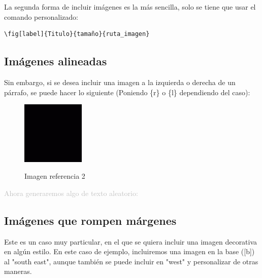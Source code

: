 La segunda forma de incluir imágenes es la más sencilla, solo se tiene que usar el comando personalizado:
\begin{verbatim} 
\fig[label]{Titulo}{tamaño}{ruta_imagen}
\end{verbatim}



\subsection{Imágenes alineadas}
Sin embargo, si se desea incluir una imagen a la izquierda o derecha de un párrafo, se puede hacer lo siguiente (Poniendo \{r\} o \{l\} dependiendo del caso):

\begin{figure} %
    \centering
    \begin{measuredfigure}
        \caption{Imagen referencia 2}
        \includegraphics[height=3cm]{img/cuadradoejemplo.png} %
        \label{img:referencia2}
    \end{measuredfigure}
\end{figure}


\textcolor{silver}{
    Ahora generaremos algo de texto aleatorio:
    \lipsum[2]
}

\subsection{Imágenes que rompen márgenes}

Este es un caso muy particular, en el que se quiera incluir una imagen decorativa en algún estilo. En este caso de ejemplo, incluiremos una imagen en la base ([b]) al "south east", aunque también se puede incluir en "west" y personalizar de otras maneras.

